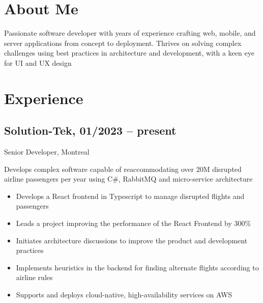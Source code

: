 \documentclass{article}
\begin{document}
\begin{paracol}{2}
\begin{rightcolumn}
    \vspace{-2.5em}
    \section{About Me}

    Passionate software developer with  years of experience
    crafting web, mobile, and server applications from concept to deployment. Thrives
    on solving complex challenges using best practices in architecture and development,
    with a keen eye for UI and UX design

    \section{Experience}

    \subsection{Solution-Tek, 01/2023 -- present}
    {Senior Developer, Montreal\par}
    {
      Develops complex software capable of reaccommodating over 20M disrupted airline passengers per year
      using C\#, RabbitMQ and micro-service architecture
    \par}
    \begin{itemize}
      \item Develops a React frontend in Typescript to manage disrupted flights and passengers
      \item Leads a project improving the performance of the React Frontend by 300\%
      \item Initiates architecture discussions to improve the product and development practices
      \item Implements heuristics in the backend for finding alternate flights according to airline rules
      \item Supports and deploys cloud-native, high-availability services on AWS
    \end{itemize}

    \vspace{1em}


\end{rightcolumn}
\end{paracol}
\end{document}
